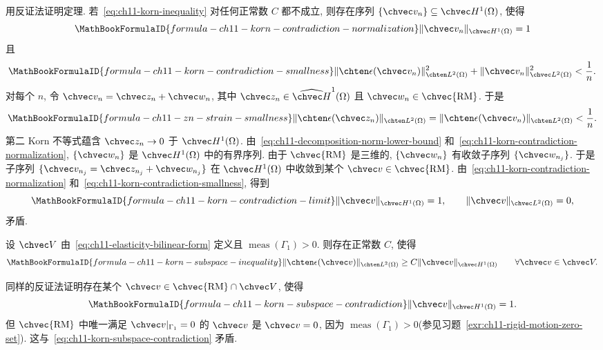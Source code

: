 \begin{Proof}
用反证法证明定理. 若~\eqref{eq:ch11-korn-inequality} 对任何正常数 $C$ 都不成立, 则存在序列 $\{\chvec v_n\}\subseteq\chvec H^1(\Omega)$, 使得
\begin{equation}
\MathBookFormulaID{formula-ch11-korn-contradiction-normalization}
\label{eq:ch11-korn-contradiction-normalization}
\|\chvec v_n\|_{\chvec H^1(\Omega)}=1
\end{equation}
且
\begin{equation}
\MathBookFormulaID{formula-ch11-korn-contradiction-smallness}
\label{eq:ch11-korn-contradiction-smallness}
\|\chten\epsilon(\chvec v_n)\|_{\chten L^2(\Omega)}^2
+\|\chvec v_n\|_{\chvec L^2(\Omega)}^2<\frac1n.
\end{equation}
对每个 $n$, 令 $\chvec v_n=\chvec z_n+\chvec w_n$, 其中
$\chvec z_n\in\widehat{\chvec H}^1(\Omega)$ 且 $\chvec w_n\in\chvec{\mathrm{RM}}$. 于是
\[
\MathBookFormulaID{formula-ch11-zn-strain-smallness}
\|\chten\epsilon(\chvec z_n)\|_{\chten L^2(\Omega)}
=\|\chten\epsilon(\chvec v_n)\|_{\chten L^2(\Omega)}<\frac1n.
\]
第二 Korn 不等式蕴含 $\chvec z_n\to0$ 于 $\chvec H^1(\Omega)$. 由~\eqref{eq:ch11-decomposition-norm-lower-bound} 和~\eqref{eq:ch11-korn-contradiction-normalization}, $\{\chvec w_n\}$ 是 $\chvec H^1(\Omega)$ 中的有界序列. 由于 $\chvec{\mathrm{RM}}$ 是三维的, $\{\chvec w_n\}$ 有收敛子序列 $\{\chvec w_{n_j}\}$. 于是子序列 $\{\chvec v_{n_j}=\chvec z_{n_j}+\chvec w_{n_j}\}$ 在 $\chvec H^1(\Omega)$ 中收敛到某个 $\chvec v\in\chvec{\mathrm{RM}}$. 由~\eqref{eq:ch11-korn-contradiction-normalization} 和~\eqref{eq:ch11-korn-contradiction-smallness}, 得到
\[
\MathBookFormulaID{formula-ch11-korn-contradiction-limit}
\|\chvec v\|_{\chvec H^1(\Omega)}=1,
\qquad
\|\chvec v\|_{\chvec L^2(\Omega)}=0,
\]
矛盾.
\end{Proof}

\begin{Corollary}
\label{cor:ch11-korn-subspace}
设 $\chvec V$ 由~\eqref{eq:ch11-elasticity-bilinear-form} 定义且 $\operatorname{meas}(\Gamma_1)>0$. 则存在正常数 $C$, 使得
\begin{equation}
\MathBookFormulaID{formula-ch11-korn-subspace-inequality}
\label{eq:ch11-korn-subspace-inequality}
\|\chten\epsilon(\chvec v)\|_{\chten L^2(\Omega)}
\geq C\|\chvec v\|_{\chvec H^1(\Omega)}
\qquad\forall\chvec v\in\chvec V.
\end{equation}
\end{Corollary}

\begin{Proof}
同样的反证法证明存在某个 $\chvec v\in\chvec{\mathrm{RM}}\cap\chvec V$, 使得
\begin{equation}
\MathBookFormulaID{formula-ch11-korn-subspace-contradiction}
\label{eq:ch11-korn-subspace-contradiction}
\|\chvec v\|_{\chvec H^1(\Omega)}=1.
\end{equation}
但 $\chvec{\mathrm{RM}}$ 中唯一满足 $\chvec v|_{\Gamma_1}=0$ 的 $\chvec v$ 是 $\chvec v=0$, 因为 $\operatorname{meas}(\Gamma_1)>0$(参见习题~\ref{exr:ch11-rigid-motion-zero-set}). 这与~\eqref{eq:ch11-korn-subspace-contradiction} 矛盾.
\end{Proof}


